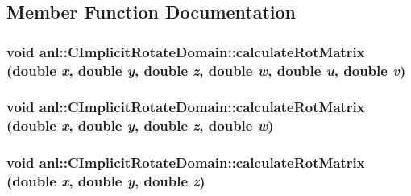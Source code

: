 \subsection{Member Function Documentation}
\hypertarget{classanl_1_1CImplicitRotateDomain_a59d57e28efeef32a3d30417a210713a9}{
\subsubsection[{calculateRotMatrix}]{\setlength{\rightskip}{0pt plus 5cm}void anl::CImplicitRotateDomain::calculateRotMatrix (double {\em x}, \/  double {\em y}, \/  double {\em z}, \/  double {\em w}, \/  double {\em u}, \/  double {\em v})}}
\label{classanl_1_1CImplicitRotateDomain_a59d57e28efeef32a3d30417a210713a9}
\hypertarget{classanl_1_1CImplicitRotateDomain_a4a64050cc38be876a234e4b4c33c3533}{
\subsubsection[{calculateRotMatrix}]{\setlength{\rightskip}{0pt plus 5cm}void anl::CImplicitRotateDomain::calculateRotMatrix (double {\em x}, \/  double {\em y}, \/  double {\em z}, \/  double {\em w})}}
\label{classanl_1_1CImplicitRotateDomain_a4a64050cc38be876a234e4b4c33c3533}
\hypertarget{classanl_1_1CImplicitRotateDomain_af442390b1e756deb0f6dd4b49ce53995}{
\subsubsection[{calculateRotMatrix}]{\setlength{\rightskip}{0pt plus 5cm}void anl::CImplicitRotateDomain::calculateRotMatrix (double {\em x}, \/  double {\em y}, \/  double {\em z})}}
